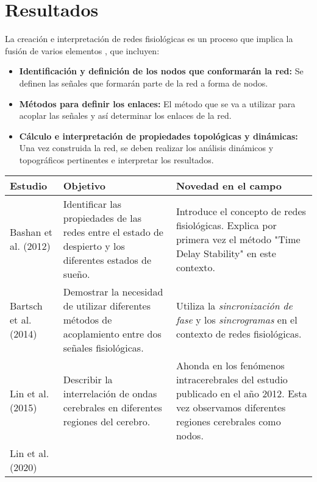 \documentclass[twoside,twocolumn]{article}
\begin{document}
\section{Resultados}
La creación e interpretación de redes fisiológicas es un proceso que implica la fusión de varios elementos \cite{barajas2021sex}, que incluyen:
\begin{itemize}
  \item \textbf{Identificación y definición de los nodos que conformarán la red:} Se definen las señales que formarán parte de la red a forma de nodos.
  \item \textbf{Métodos para definir los enlaces:} El método que se va a utilizar para acoplar las señales y así determinar los enlaces de la red.
  \item \textbf{Cálculo e interpretación de propiedades topológicas y dinámicas:} \cite{adams2021gabaergic} Una vez construida la red, se deben realizar los análisis dinámicos y topográficos pertinentes e interpretar los resultados.
\end{itemize}
\onecolumn
\begin{center}
  \begin{tabular}{|lp{5cm}p{5cm}|}
    \hline
    Estudio & Objetivo & Novedad en el campo \\
    \hline
    Bashan et al. (2012) \cite{bashan2012network} &
    Identificar las propiedades de las redes entre el estado de despierto y los diferentes estados de sueño.
    &
    Introduce el concepto de redes fisiológicas. Explica por primera vez el método "Time Delay Stability" en este contexto.
    \\ \hline
    Bartsch et al. (2014)\cite{bartsch2014coexisting} &
    Demostrar la necesidad de utilizar diferentes métodos de acoplamiento entre dos señales fisiológicas.
    &
    Utiliza la \textit{sincronización de fase} y los \textit{sincrogramas} en el contexto de redes fisiológicas.
    \\ \hline
    Lin et al. (2015) \cite{2015Plasticity} &
    Describir la interrelación de ondas cerebrales en diferentes regiones del cerebro.
    &
    Ahonda en los fenómenos intracerebrales del estudio publicado en el año 2012. Esta vez observamos diferentes regiones cerebrales como nodos.
    \\ \hline
    Lin et al. (2020) \cite{lin2020dynamic} & & \\
    \hline
  \end{tabular}
\end{center}
\end{document}
